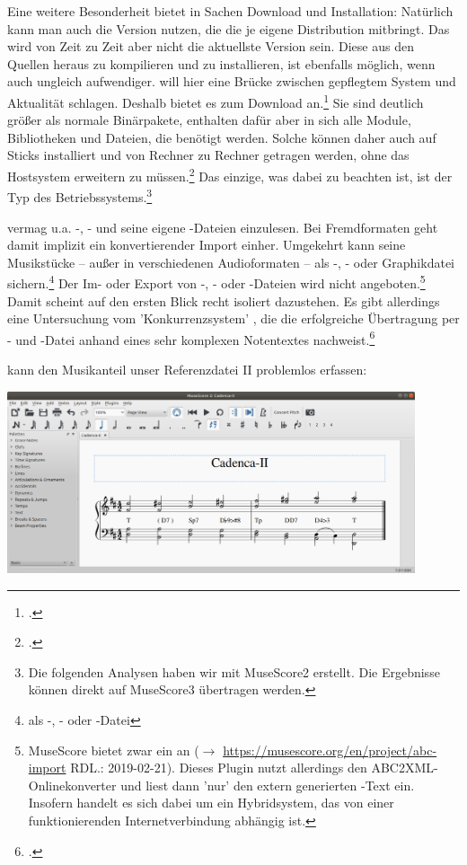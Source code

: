 Eine weitere Besonderheit bietet  in Sachen Download und
Installation: Natürlich kann man auch die Version nutzen, die die je eigene
Distribution mitbringt. Das wird von Zeit zu Zeit aber nicht die aktuellste
Version sein. Diese aus den Quellen heraus zu kompilieren und zu installieren,
ist ebenfalls möglich, wenn auch ungleich aufwendiger.  will hier
eine Brücke zwischen gepflegtem System und Aktualität schlagen. Deshalb bietet
es  zum Download an.\footcite[vgl.][\nopage wp.]{MuseScore2019b}
Sie sind deutlich größer als normale Binärpakete, enthalten dafür aber in sich
alle Module, Bibliotheken und Dateien, die benötigt werden.
Solche  können daher auch auf Sticks installiert und von Rechner
zu Rechner getragen werden, ohne das Hostsystem erweitern zu
müssen.\footcite[vgl. dazu][\nopage wp.]{Prakash2018a} Das einzige, was dabei zu
beachten ist, ist der Typ des Betriebssystems.\footnote{Die folgenden Analysen
haben wir mit MuseScore2 erstellt. Die Ergebnisse können direkt auf MuseScore3
übertragen werden.}

 vermag u.a. -, - und seine eigene
-Dateien einzulesen. Bei Fremdformaten geht damit implizit ein
konvertierender Import einher. Umgekehrt kann  seine Musikstücke
-- außer in verschiedenen Audioformaten -- als -, - oder
Graphikdatei sichern.\footnote{als -, - oder -Datei}
Der Im- oder Export von -, - oder -Dateien
wird nicht angeboten.\footnote{MuseScore bietet zwar ein 
an ($\rightarrow$ \href{https://musescore.org/en/project/abc-import}
{https://musescore.org/en/project/abc-import} RDL.: 2019-02-21). Dieses Plugin
nutzt allerdings den ABC2XML-Onlinekonverter und liest dann 'nur' den extern
generierten -Text ein. Insofern handelt es sich dabei um ein
Hybridsystem, das von einer funktionierenden Internetverbindung abhängig ist.}
Damit scheint  auf den ersten Blick recht isoliert dazustehen. Es
gibt allerdings eine Untersuchung vom 'Konkurrenzsystem' , die die
erfolgreiche Übertragung per - und -Datei anhand eines
sehr komplexen Notentextes nachweist.\footcite[vgl.][\nopage wp.]{Denemo2019a}

 kann den Musikanteil unser Referenzdatei II problemlos erfassen:

\begin{center}
\includegraphics[width=0.9\textwidth]{frontends/musescore/cadenca2-musescore-300dpi.png}
\end{center}

